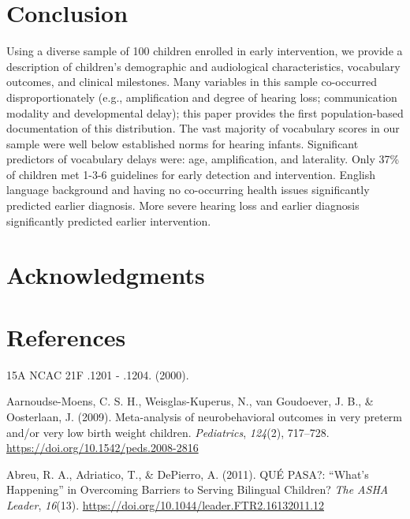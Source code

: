 \documentclass[english,man]{apa6}
\begin{document}
\hypertarget{conclusion}{%
\section{Conclusion}\label{conclusion}}

Using a diverse sample of 100 children enrolled in early intervention, we provide a description of children's demographic and audiological characteristics, vocabulary outcomes, and clinical milestones. Many variables in this sample co-occurred disproportionately (e.g., amplification and degree of hearing loss; communication modality and developmental delay); this paper provides the first population-based documentation of this distribution. The vast majority of vocabulary scores in our sample were well below established norms for hearing infants. Significant predictors of vocabulary delays were: age, amplification, and laterality. Only 37\% of children met 1-3-6 guidelines for early detection and intervention. English language background and having no co-occurring health issues significantly predicted earlier diagnosis. More severe hearing loss and earlier diagnosis significantly predicted earlier intervention.

\hypertarget{acknowledgments}{%
\section{Acknowledgments}\label{acknowledgments}}

\pagebreak

\hypertarget{references}{%
\section*{References}\label{references}}

\hypertarget{refs}{}
\leavevmode\hypertarget{ref-2000}{}%
15A NCAC 21F .1201 - .1204. (2000).

\leavevmode\hypertarget{ref-aarnoudse-moens2009}{}%
Aarnoudse-Moens, C. S. H., Weisglas-Kuperus, N., van Goudoever, J. B., \& Oosterlaan, J. (2009). Meta-analysis of neurobehavioral outcomes in very preterm and/or very low birth weight children. \emph{Pediatrics}, \emph{124}(2), 717--728. \url{https://doi.org/10.1542/peds.2008-2816}

\leavevmode\hypertarget{ref-abreu2011}{}%
Abreu, R. A., Adriatico, T., \& DePierro, A. (2011). QUÉ PASA?: ``What's Happening'' in Overcoming Barriers to Serving Bilingual Children? \emph{The ASHA Leader}, \emph{16}(13). \url{https://doi.org/10.1044/leader.FTR2.16132011.12}
\end{document}
